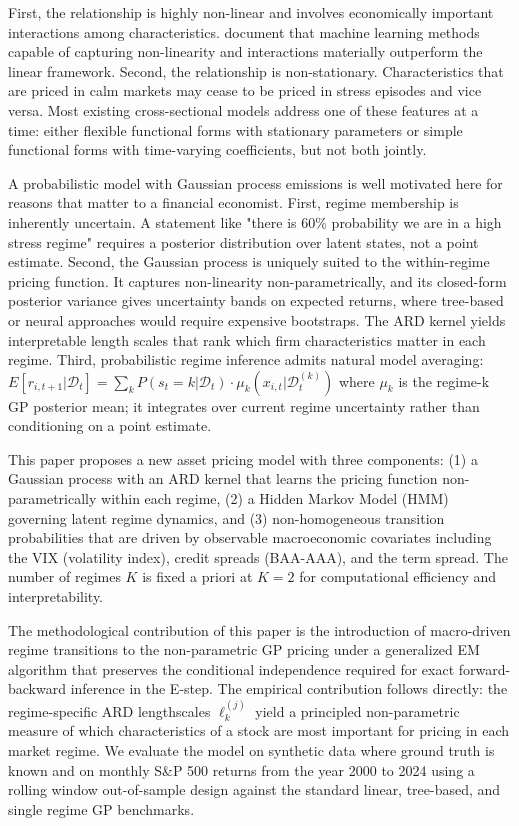\documentclass[11pt]{article}
\begin{document}
First, the relationship is highly non-linear and involves economically important interactions among characteristics. \cite{gu_empirical_2020} document that machine learning methods capable of capturing non-linearity and interactions materially outperform the linear \cite{fama_risk_1973} framework. Second, the relationship is non-stationary. Characteristics that are priced in calm markets may cease to be priced in stress episodes and vice versa. Most existing cross-sectional models address one of these features at a time: either flexible functional forms with stationary parameters or simple functional forms with time-varying coefficients, but not both jointly. 

A probabilistic model with Gaussian process emissions is well motivated here for reasons that matter to a financial economist. First, regime membership is inherently uncertain. A statement like "there is 60\% probability we are in a high stress regime" requires a posterior distribution over latent states, not a point estimate. Second, the Gaussian process is uniquely suited to the within-regime pricing function. It captures non-linearity non-parametrically, and its closed-form posterior variance gives uncertainty bands on expected returns, where tree-based or neural approaches would require expensive bootstraps. The ARD kernel yields interpretable length scales that rank which firm characteristics matter in each regime. Third, probabilistic regime inference admits natural model averaging: $E[r_{i, t+1} | \mathcal{D}_t] = \sum_k P(s_t = k |\mathcal{D}_t) \cdot \mu_k(x_{i,t} | \mathcal{D}_t^{(k)})$ where $\mu_k$ is the regime-k GP posterior mean; it integrates over current regime uncertainty rather than conditioning on a point estimate. 

This paper proposes a new asset pricing model with three components: (1) a Gaussian process with an ARD kernel that learns the pricing function non-parametrically within each regime, (2) a Hidden Markov Model (HMM) governing latent regime dynamics, and (3) non-homogeneous transition probabilities that are driven by observable macroeconomic covariates including the VIX (volatility index), credit spreads (BAA-AAA), and the term spread. The number of regimes $K$ is fixed a priori at $K=2$ for computational efficiency and interpretability. 

The methodological contribution of this paper is the introduction of macro-driven regime transitions to the non-parametric GP pricing under a generalized EM algorithm that preserves the conditional independence required for exact forward-backward inference in the E-step. The empirical contribution follows directly: the regime-specific ARD lengthscales $\ell_k^{(j)}$ yield a principled non-parametric measure of which characteristics of a stock are most important for pricing in each market regime. We evaluate the model on synthetic data where ground truth is known and on monthly S\&P 500 returns from the year 2000 to 2024 using a rolling window out-of-sample design against the standard linear, tree-based, and single regime GP benchmarks.
\end{document}
